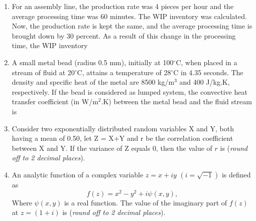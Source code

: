 \documentclass[12pt,onecolumn]{article}
\begin{document}
\begin{enumerate}
    \item For an assembly line, the production rate was 4 pieces per hour and the average processing time was 60 minutes. The WIP inventory was calculated. Now, the production rate is kept the same, and the average processing time is brought down by 30 percent. As a result of this change in the processing time, the WIP inventory
          \begin{enumerate}
          \end{enumerate}

    \item A small metal bead (radius 0.5 mm), initially at 100$^\circ$C, when placed in a stream of fluid at 20$^\circ$C, attains a temperature of 28$^\circ$C in 4.35 seconds. The density and specific heat of the metal are 8500 kg/m$^3$ and 400 J/kg.K, respectively. If the bead is considered as lumped system, the convective heat transfer coefficient (in W/m$^2$.K) between the metal bead and the fluid stream is
          \begin{enumerate}
          \end{enumerate}

    \item Consider two exponentially distributed random variables X and Y, both having a mean of 0.50, let Z = X+Y and r be the correlation coefficient between X and Y. If the variance of Z equals 0, then the value of $r$ is \underline{\hspace{2cm}} (\textit{round off to 2 decimal places}).
    \item An analytic function of a complex variable $z=x + iy$ $(i = \sqrt{-1})$ is defined as
          \[
              f(z) = x^2 - y^2 + i\psi(x,y),
          \]
          Where $\psi(x,y)$ is a real function. The value of the imaginary part of $f(z)$ at $z=(1+i)$ is \underline{\hspace{2cm}} (\textit{round off to 2 decimal places}).


\end{enumerate}
\end{document}
